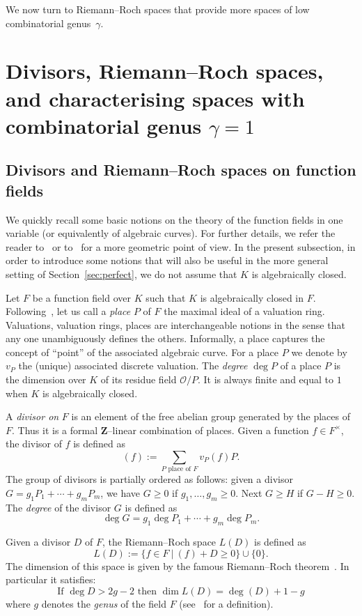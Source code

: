 \documentclass[ALCO,Unicode,ThmDefs]{cedram}
\newcommand*\Z{{\mathbf Z}}
\newcommand*\OO{\mathcal{O}}
\renewcommand{\geq}{\geqslant}
\begin{document}
We now turn to Riemann--Roch spaces that provide more spaces of low combinatorial genus~$\gamma$.


\section{Divisors, Riemann--Roch spaces, and characterising spaces with combinatorial genus \texorpdfstring{$\gamma=1$}{gamma=1}}\label{sec:divisors}

\subsection{Divisors and Riemann--Roch spaces on function fields}\label{subsec:divisors}

We quickly recall some basic notions on the theory of the function fields in one variable (or equivalently of algebraic curves). For further details, we refer the reader to~\cite{Stichtenoth} or to~\cite{Fulton} for a more geometric point of view. In the present subsection, in order to introduce some notions that will also be useful in the more general setting of Section~\ref{sec:perfect}, we do not assume that $K$ is algebraically closed.

Let $F$ be a function field over $K$ such that $K$ is algebraically closed in $F$. Following~\cite[Chapter~I]{Stichtenoth}, let us call a \emph{place} $P$ of $F$ the maximal ideal of a valuation ring. Valuations, valuation rings, places are interchangeable notions in the sense that any one unambiguously defines the others. Informally, a place captures the concept of ``point'' of the associated algebraic curve. For a place $P$ we denote by $v_P$ the (unique) associated discrete valuation. The \emph{degree} $\deg P$ of a place $P$ is the dimension over $K$ of its residue field $\OO/P$. It is always finite and equal to $1$ when $K$ is algebraically closed.

A \emph{divisor on} $F$ is an element of the free abelian group generated by the places of $F$. Thus it is a formal $\Z$--linear combination of places. Given a function $f \in F^{\times}$, the divisor of $f$ is defined as
\[
(f):=\sum_{P \textrm{ place of } F} v_P(f)P.
\]
The group of divisors is partially ordered as follows: given a divisor $G= g_1 P_1 + \cdots + g_m P_m$, we have $G\geq0$ if $g_1, \dots, g_m\geq0$. Next $G\geq H$ if $G-H\geq0$. The \emph{degree} of the divisor $G$ is defined as
\[
\deg G= g_1\deg P_1 + \cdots +g_m\deg P_m.
\]

Given a divisor $D$ of $F$, the Riemann--Roch space $L(D)$ is defined as
\[
L(D):=\{ f\in F~|~(f) + D\geq0\} \cup \{0\}.
\]
The dimension of this space is given by the famous Riemann--Roch theorem~\cite[Theorem~1.5.15]{Stichtenoth}. In particular it satisfies:
\begin{equation*}
\text{If } \deg D>2g-2 \text{ then }\dim L(D)=\deg(D)+1-g
\end{equation*}
where $g$ denotes the \emph{genus} of the field $F$ (see~\cite[Definition~1.4.15]{Stichtenoth} for a definition).
\end{document}
